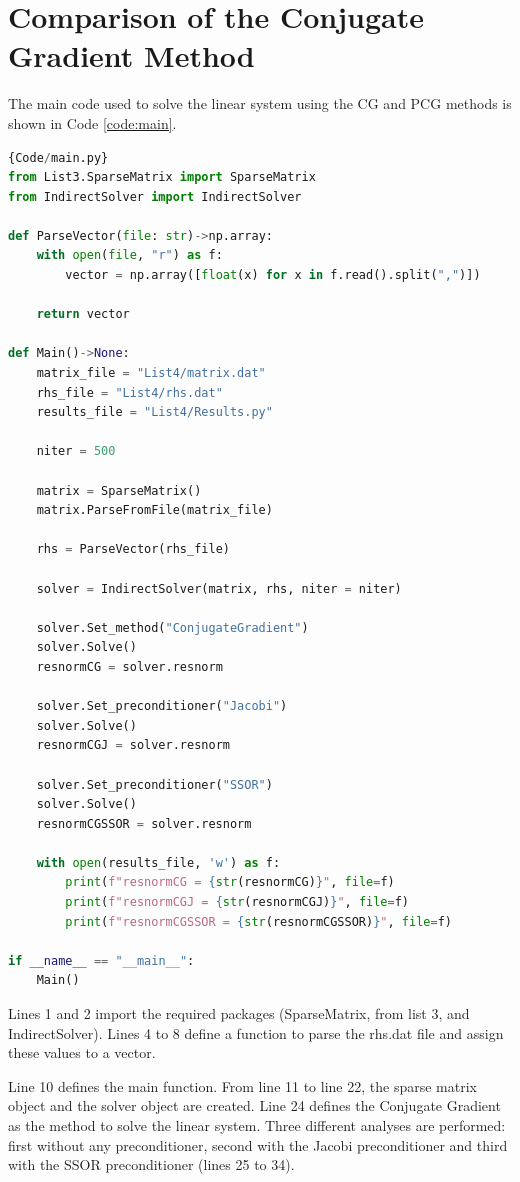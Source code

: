 \section{Comparison of the Conjugate Gradient Method}\label{sec:results}
The main code used to solve the linear system using the CG and PCG methods is shown in Code \ref{code:main}. 
\begin{lstlisting}[language=Python, caption={Main code to solve the linear system using the CG and PCG methods.}, label={code:main}]{Code/main.py}
from List3.SparseMatrix import SparseMatrix
from IndirectSolver import IndirectSolver

def ParseVector(file: str)->np.array:
    with open(file, "r") as f:
        vector = np.array([float(x) for x in f.read().split(",")])      
    
    return vector

def Main()->None:
    matrix_file = "List4/matrix.dat"
    rhs_file = "List4/rhs.dat"
    results_file = "List4/Results.py"

    niter = 500

    matrix = SparseMatrix()
    matrix.ParseFromFile(matrix_file)

    rhs = ParseVector(rhs_file)

    solver = IndirectSolver(matrix, rhs, niter = niter)

    solver.Set_method("ConjugateGradient")
    solver.Solve()
    resnormCG = solver.resnorm

    solver.Set_preconditioner("Jacobi")
    solver.Solve()
    resnormCGJ = solver.resnorm

    solver.Set_preconditioner("SSOR")
    solver.Solve()
    resnormCGSSOR = solver.resnorm

    with open(results_file, 'w') as f:
        print(f"resnormCG = {str(resnormCG)}", file=f)
        print(f"resnormCGJ = {str(resnormCGJ)}", file=f)
        print(f"resnormCGSSOR = {str(resnormCGSSOR)}", file=f)

if __name__ == "__main__":
    Main()
\end{lstlisting}

Lines 1 and 2 import the required packages (SparseMatrix, from list 3, and IndirectSolver). Lines 4 to 8 define a function to parse the rhs.dat file and assign these values to a vector. 

Line 10 defines the main function. From line 11 to line 22, the sparse matrix object and the solver object are created. Line 24 defines the Conjugate Gradient as the method to solve the linear system. Three different analyses are performed: first without any preconditioner, second with the Jacobi preconditioner and third with the SSOR preconditioner (lines 25 to 34). 

